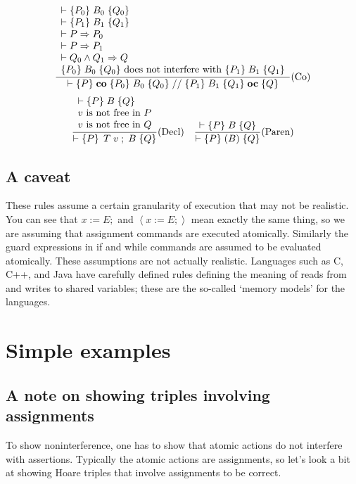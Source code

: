 \documentclass[muchmore,11pt]{article}%
\begin{document}
\[
\frac{%
\begin{array}
[c]{l}%
\vdash\{P_{0}\}\;B_{0}\;\{Q_{0}\}\\
\vdash\{P_{1}\}\;B_{1}\;\{Q_{1}\}\\
\vdash P\Rightarrow P_{0}\\
\vdash P\Rightarrow P_{1}\\
\vdash Q_{0}\wedge Q_{1}\Rightarrow Q\\
\{P_{0}\}\;B_{0}\;\{Q_{0}\}\text{ does not interfere with }\{P_{1}%
\}\;B_{1}\;\{Q_{1}\}
\end{array}
}{\vdash\{P\}\;\mathbf{co}\;\{P_{0}\}\;B_{0}\;\{Q_{0}\}\;//\;\{P_{1}%
\}\;B_{1}\;\{Q_{1}\}\;\mathbf{oc}\;\{Q\}}\text{(Co)}%
\]%
\[
\frac{%
\begin{array}
[c]{l}%
\vdash\{P\}\;B\;\{Q\}\\
v\text{ is not free in }P\\
v\text{ is not free in }Q
\end{array}
}{\vdash\left\{  P\right\}  \;T\;v\;;\;B\;\{Q\}}\text{(Decl)\quad}\frac
{\vdash\{P\}\;B\;\{Q\}}{\vdash\{P\}\;(B)\;\{Q\}}\text{(Paren)}%
\]


\subsection{A caveat\label{sec:caveat}}

These rules assume a certain granularity of execution that may not be
realistic. You can see that $x:=E;$ and $\left\langle x:=E;\right\rangle $
mean exactly the same thing, so we are assuming that assignment commands are
executed atomically. Similarly the guard expressions in if and while commands
are assumed to be evaluated atomically. These assumptions are not actually
realistic. Languages such as C, C++, and Java have carefully defined rules
defining the meaning of reads from and writes to shared variables; these are
the so-called `memory models' for the languages.

\section{Simple examples\label{simple}}

\subsection{A note on showing triples involving assignments}

To show noninterference, one has to show that atomic actions do not interfere
with assertions. Typically the atomic actions are assignments, so let's look a
bit at showing Hoare triples that involve assignments to be correct.
\end{document}
